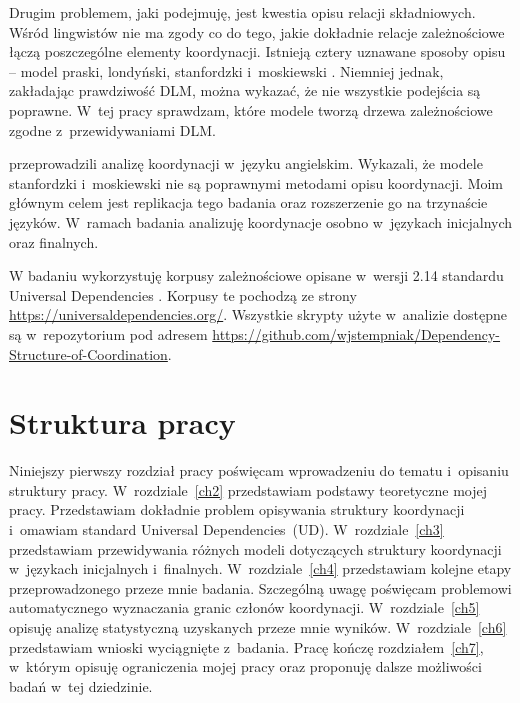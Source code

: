 Drugim problemem, jaki podejmuję, jest kwestia opisu relacji składniowych. Wśród lingwistów nie ma zgody co do tego, jakie dokładnie relacje zależnościowe łączą poszczególne elementy koordynacji. Istnieją cztery uznawane sposoby opisu -- model praski, londyński, stanfordzki i~moskiewski \citep{popel2013coordination, przepiorkowski2023conjunct}. Niemniej jednak, zakładając prawdziwość DLM, można wykazać, że nie wszystkie podejścia są poprawne. W~tej pracy sprawdzam, które modele tworzą drzewa zależnościowe zgodne z~przewidywaniami DLM.

\cite{przepiorkowski2023conjunct} przeprowadzili analizę koordynacji w~języku angielskim. Wykazali, że modele stanfordzki i~moskiewski nie są poprawnymi metodami opisu koordynacji. Moim głównym celem jest replikacja tego badania oraz rozszerzenie go na trzynaście języków. W~ramach badania analizuję koordynacje osobno w~językach inicjalnych oraz finalnych. 

W badaniu wykorzystuję korpusy zależnościowe opisane w~wersji 2.14 standardu Universal Dependencies \citep{de2021universal}. Korpusy te pochodzą ze strony \url{https://universaldependencies.org/}. 
Wszystkie skrypty użyte w~analizie dostępne są w~repozytorium pod adresem \url{https://github.com/wjstempniak/Dependency-Structure-of-Coordination}.

\section{Struktura pracy}

Niniejszy pierwszy rozdział pracy poświęcam wprowadzeniu do tematu i~opisaniu struktury pracy. W~rozdziale~\ref{ch2} przedstawiam podstawy teoretyczne mojej pracy. Przedstawiam dokładnie problem opisywania struktury koordynacji i~omawiam standard Universal Dependencies~(UD). W~rozdziale~\ref{ch3} przedstawiam przewidywania różnych modeli dotyczących struktury koordynacji w~językach inicjalnych i~finalnych. W~rozdziale~\ref{ch4} przedstawiam kolejne etapy przeprowadzonego przeze mnie badania. Szczególną uwagę poświęcam problemowi automatycznego wyznaczania granic członów koordynacji. W~rozdziale~\ref{ch5} opisuję analizę statystyczną uzyskanych przeze mnie wyników. W~rozdziale~\ref{ch6} przedstawiam wnioski wyciągnięte z~badania. Pracę kończę rozdziałem~\ref{ch7}, w~którym opisuję ograniczenia mojej pracy oraz proponuję dalsze możliwości badań w~tej dziedzinie.
